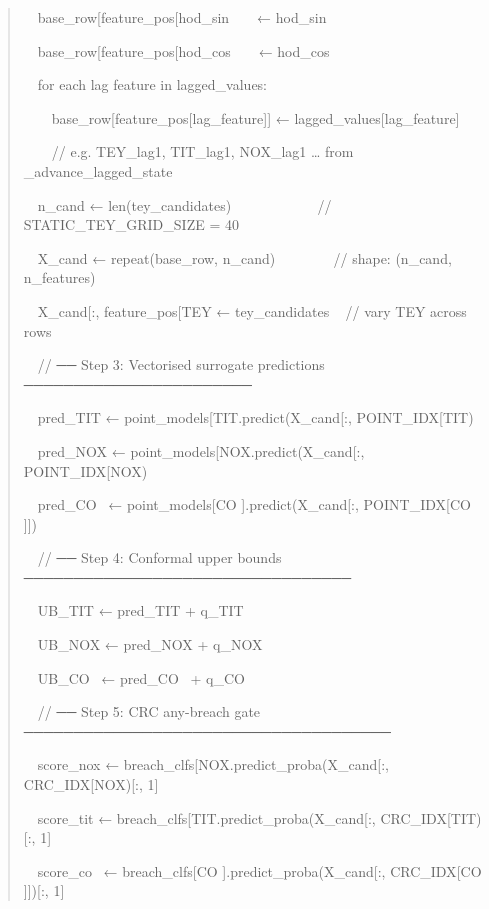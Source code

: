\documentclass[11pt]{article}
\begin{document}
\begin{quote}
~~base\_row{[}feature\_pos{[}\textquotesingle hod\_sin\textquotesingle{]}{]}
~ ~ ← hod\_sin

~~base\_row{[}feature\_pos{[}\textquotesingle hod\_cos\textquotesingle{]}{]}
~ ~ ← hod\_cos

~~for each lag feature in lagged\_values:

~~~~base\_row{[}feature\_pos{[}lag\_feature{]}{]} ←
lagged\_values{[}lag\_feature{]}

~~~~// e.g. TEY\_lag1, TIT\_lag1, NOX\_lag1 \ldots{} from
\_advance\_lagged\_state

~~n\_cand ← len(tey\_candidates) ~ ~ ~ ~ ~ ~ ~ //
STATIC\_TEY\_GRID\_SIZE = 40

~~X\_cand ← repeat(base\_row, n\_cand)~ ~ ~ ~ ~ // shape: (n\_cand,
n\_features)

~~X\_cand{[}:, feature\_pos{[}\textquotesingle TEY\textquotesingle{]}{]}
← tey\_candidates ~ // vary TEY across rows

~~// ── Step 3: Vectorised surrogate predictions ───────────────────────

~~pred\_TIT ←
point\_models{[}\textquotesingle TIT\textquotesingle{]}.predict(X\_cand{[}:,
POINT\_IDX{[}\textquotesingle TIT\textquotesingle{]}{]})

~~pred\_NOX ←
point\_models{[}\textquotesingle NOX\textquotesingle{]}.predict(X\_cand{[}:,
POINT\_IDX{[}\textquotesingle NOX\textquotesingle{]}{]})

~~pred\_CO~ ← point\_models{[}\textquotesingle CO\textquotesingle{}
{]}.predict(X\_cand{[}:,
POINT\_IDX{[}\textquotesingle CO\textquotesingle{} {]}{]})

~~// ── Step 4: Conformal upper bounds ─────────────────────────────────

~~UB\_TIT ← pred\_TIT + q\_TIT

~~UB\_NOX ← pred\_NOX + q\_NOX

~~UB\_CO~ ← pred\_CO~ + q\_CO

~~// ── Step 5: CRC any-breach gate
─────────────────────────────────────

~~score\_nox ←
breach\_clfs{[}\textquotesingle NOX\textquotesingle{]}.predict\_proba(X\_cand{[}:,
CRC\_IDX{[}\textquotesingle NOX\textquotesingle{]}{]}){[}:, 1{]}

~~score\_tit ←
breach\_clfs{[}\textquotesingle TIT\textquotesingle{]}.predict\_proba(X\_cand{[}:,
CRC\_IDX{[}\textquotesingle TIT\textquotesingle{]}{]}){[}:, 1{]}

~~score\_co~ ← breach\_clfs{[}\textquotesingle CO\textquotesingle{}
{]}.predict\_proba(X\_cand{[}:,
CRC\_IDX{[}\textquotesingle CO\textquotesingle{} {]}{]}){[}:, 1{]}


\end{quote}
\end{document}
